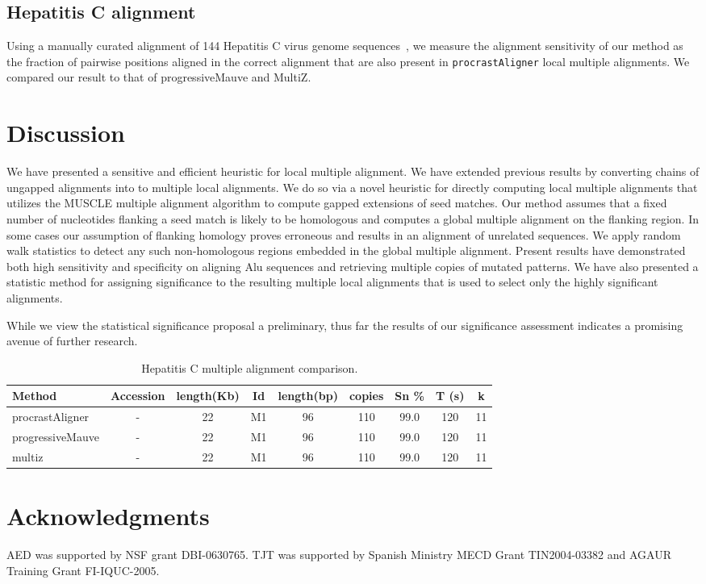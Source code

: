 \documentclass[twoside,11pt]{article}
\begin{document}
\subsection{Hepatitis C alignment}
Using a manually curated alignment of 144
Hepatitis C virus genome sequences~\cite{ref-hcvdb}, we measure the
alignment sensitivity of our method as the fraction of pairwise
positions aligned in the correct alignment that are also present in
\texttt{procrastAligner} local multiple alignments. We compared our result to that of progressiveMauve and MultiZ.


\section{Discussion}
We have presented a sensitive and efficient heuristic for local multiple alignment.  
We have extended previous results by converting chains of ungapped alignments into to multiple local alignments. We do so via a novel heuristic for directly computing local multiple alignments that utilizes the MUSCLE multiple alignment algorithm to compute gapped extensions of seed matches.  Our method assumes that a fixed number of nucleotides flanking a seed match is likely to be homologous and computes a global multiple alignment on the flanking region.  In some cases our assumption of flanking homology proves erroneous and results in an alignment of unrelated sequences.  We apply random walk statistics to detect any such non-homologous regions embedded in the global multiple alignment.
Present results have demonstrated both high sensitivity and specificity on aligning Alu
sequences and retrieving multiple copies of mutated patterns. We have also presented a statistic method for assigning significance to the resulting multiple local alignments that is used to select only the highly significant alignments. 

While we view the statistical significance proposal a preliminary, thus far the results of our significance assessment indicates a promising avenue of further research. 



\begin{table}[t!]
\begin{center}
\begin{tabular}{|l|c|c|c|c|c|c|c|c|}
\hline Method & Accession & length(Kb) & Id & length(bp) & copies &  Sn \% & T (s) & k\\
\hline procrastAligner   & - & 22 & M1 & 96 & 110 & 99.0 & 120 & 11 \\
\hline progressiveMauve & - & 22 & M1 & 96 & 110 & 99.0 & 120 & 11 \\
\hline multiz & - & 22 & M1 & 96 & 110 & 99.0 & 120 & 11 \\
\hline
\end{tabular}
\caption{Hepatitis C multiple alignment comparison.}
\label{tab-results}
\end{center}
\end{table}

\section{ Acknowledgments }
AED was supported by NSF grant DBI-0630765. TJT was
supported by Spanish Ministry MECD Grant TIN2004-03382 and AGAUR
Training Grant FI-IQUC-2005.

\small

\end{document}
